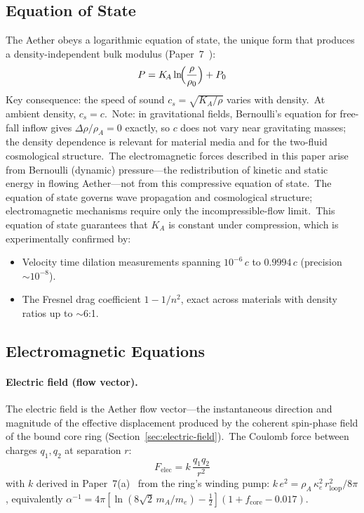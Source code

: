 ﻿\documentclass[12pt,letterpaper]{article}
\newcommand{\rhoa}{\rho_{\!A}}
\newcommand{\Ka}{K_{\!A}}
\begin{document}
\subsection{Equation of State}

The Aether obeys a logarithmic equation of state, the unique form that produces
a density-independent bulk modulus (Paper~7~\cite{otto-quantum}):
%
\begin{equation}
  P = \Ka \ln\!\Bigl(\frac{\rho}{\rho_0}\Bigr) + P_0
  \label{eq:sum-eos}
\end{equation}
%
Key consequence: the speed of sound $c_s = \sqrt{\Ka/\rho}$ varies with
density.\ At ambient density, $c_s = c$.\ Note: in gravitational fields,
Bernoulli's equation for free-fall inflow gives $\Delta\rho/\rhoa = 0$
exactly, so $c$ does not vary near gravitating masses; the density
dependence is relevant for material media and for the two-fluid
cosmological structure.\ The electromagnetic forces described in this paper
arise from Bernoulli (dynamic) pressure---the redistribution of kinetic and
static energy in flowing Aether---not from this compressive equation of
state.\ The equation of state governs wave propagation and cosmological
structure; electromagnetic mechanisms require only the incompressible-flow
limit.\ This equation of state guarantees that $\Ka$ is
constant under compression, which is experimentally confirmed by:
%
\begin{itemize}[leftmargin=2em]
  \item Velocity time dilation measurements spanning $10^{-6}\,c$ to $0.9994\,c$
    (precision $\sim 10^{-8}$).
  \item The Fresnel drag coefficient $1 - 1/n^2$, exact across materials with
    density ratios up to $\sim$6:1.
\end{itemize}


\subsection{Electromagnetic Equations}

\paragraph{Electric field (flow vector).}
The electric field is the Aether flow vector---the instantaneous direction and
magnitude of the effective displacement produced by the coherent spin-phase field
of the bound core ring (Section~\ref{sec:electric-field}).\ The Coulomb force between
charges $q_1, q_2$ at separation $r$:
%
\begin{equation}
  F_{\mathrm{elec}} = k\,\frac{q_1 q_2}{r^2}
  \label{eq:sum-coulomb}
\end{equation}
%
with $k$ derived in Paper~7(a)~\cite{otto-boundcore} from the ring's winding
pump: $k\,e^2 = \rhoa\,\kappa_e^2\,r_{\mathrm{loop}}^2/8\pi$, equivalently
$\alpha^{-1} = 4\pi[\ln(8\sqrt{2}\,m_A/m_e) - \tfrac12](1+f_{\mathrm{core}}-0.017)$.
\end{document}
